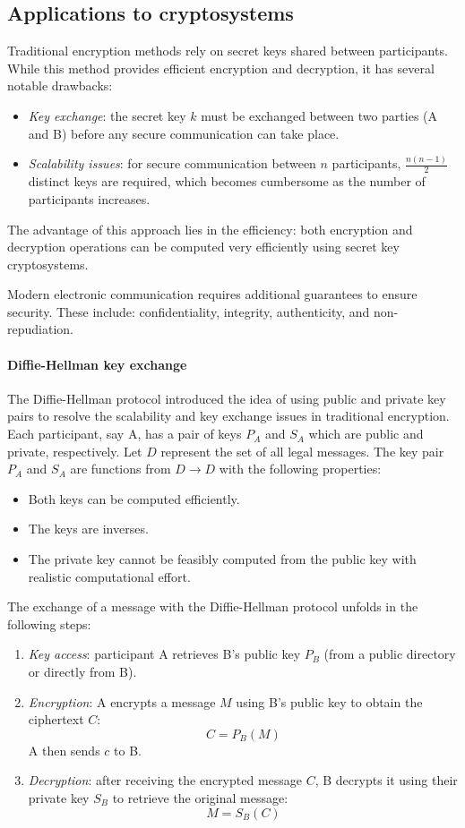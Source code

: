 \subsection{Applications to cryptosystems}
Traditional encryption methods rely on secret keys shared between participants. 
While this method provides efficient encryption and decryption, it has several notable drawbacks:
\begin{itemize}
    \item \textit{Key exchange}: the secret key $k$ must be exchanged between two parties (A and B) before any secure communication can take place.
    \item \textit{Scalability issues}: for secure communication between $n$ participants, $\frac{n(n-1)}{2}$ distinct keys are required, which becomes cumbersome as the number of participants increases.
\end{itemize}
The advantage of this approach lies in the efficiency: both encryption and decryption operations can be computed very efficiently using secret key cryptosystems.

Modern electronic communication requires additional guarantees to ensure security. 
These include: confidentiality, integrity, authenticity, and non-repudiation. 

\paragraph*{Diffie-Hellman key exchange}
The Diffie-Hellman protocol introduced the idea of using public and private key pairs to resolve the scalability and key exchange issues in traditional encryption.
Each participant, say A, has a pair of keys $P_A$ and $S_A$ which are public and private, respectively. 
Let $D$ represent the set of all legal messages.
The key pair $P_A$ and $S_A$ are functions from $D\rightarrow D$ with the following properties:
\begin{itemize}
    \item Both keys can be computed efficiently.
    \item The keys are inverses. 
    \item The private key cannot be feasibly computed from the public key with realistic computational effort.
\end{itemize}
The exchange of a message with the Diffie-Hellman protocol unfolds in the following steps: 
\begin{enumerate}
    \item \textit{Key access}: participant A retrieves B's public key $P_B$ (from a public directory or directly from B).
    \item \textit{Encryption}: A encrypts a message $M$ using B's public key to obtain the ciphertext $C$:
        \[C=P_B(M)\]
        A then sends $c$ to B.
    \item \textit{Decryption}: after receiving the encrypted message $C$, B decrypts it using their private key $S_B$ to retrieve the original message:
        \[M=S_B(C)\]
\end{enumerate}

